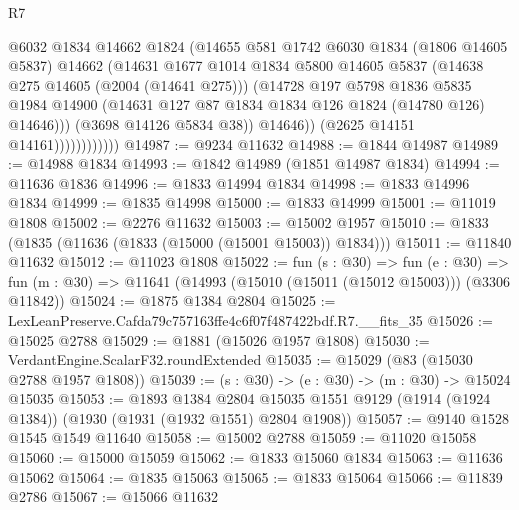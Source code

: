 \begin{lexlean}{R7}
\begin{coremodule}
                              @6032
                              @1834
                              @14662
                              @1824
                              (@14655
                                @581
                                @1742
                                @6030
                                @1834
                                (@1806 @14605 @5837)
                                @14662
                                (@14631
                                  @1677
                                  @1014
                                  @1834
                                  @5800
                                  @14605
                                  @5837
                                  (@14638 @275 @14605 (@2004 (@14641 @275)))
                                  (@14728
                                    @197
                                    @5798
                                    @1836
                                    @5835
                                    @1984
                                    @14900
                                    (@14631 @127 @87 @1834 @1834 @126 @1824 (@14780 @126) @14646)))
                                (@3698 @14126 @5834 @38))
                              @14646))
                          (@2625 @14151 @14161))))))))))))
@14987 := @9234 @11632
@14988 := @1844 @14987
@14989 := @14988 @1834
@14993 := @1842 @14989 (@1851 @14987 @1834)
@14994 := @11636 @1836
@14996 := @1833 @14994 @1834
@14998 := @1833 @14996 @1834
@14999 := @1835 @14998
@15000 := @1833 @14999
@15001 := @11019 @1808
@15002 := @2276 @11632
@15003 := @15002 @1957
@15010 := @1833 (@1835 (@11636 (@1833 (@15000 (@15001 @15003)) @1834)))
@15011 := @11840 @11632
@15012 := @11023 @1808
@15022 := fun (s : @30) =>
  fun (e : @30) => fun (m : @30) => @11641 (@14993 (@15010 (@15011 (@15012 @15003))) (@3306 @11842))
@15024 := @1875 @1384 @2804
@15025 := LexLeanPreserve.Cafda79c757163ffe4c6f07f487422bdf.R7.__fits_35
@15026 := @15025 @2788
@15029 := @1881 (@15026 @1957 @1808)
@15030 := VerdantEngine.ScalarF32.roundExtended
@15035 := @15029 (@83 (@15030 @2788 @1957 @1808))
@15039 := (s : @30) -> (e : @30) -> (m : @30) -> @15024 @15035
@15053 := @1893
    @1384
    @2804
    @15035
    @1551
    @9129
    (@1914 (@1924 @1384))
    (@1930 (@1931 (@1932 @1551) @2804 @1908))
@15057 := @9140 @1528 @1545 @1549 @11640
@15058 := @15002 @2788
@15059 := @11020 @15058
@15060 := @15000 @15059
@15062 := @1833 @15060 @1834
@15063 := @11636 @15062
@15064 := @1835 @15063
@15065 := @1833 @15064
@15066 := @11839 @2786
@15067 := @15066 @11632

\end{coremodule}
\end{lexlean}
